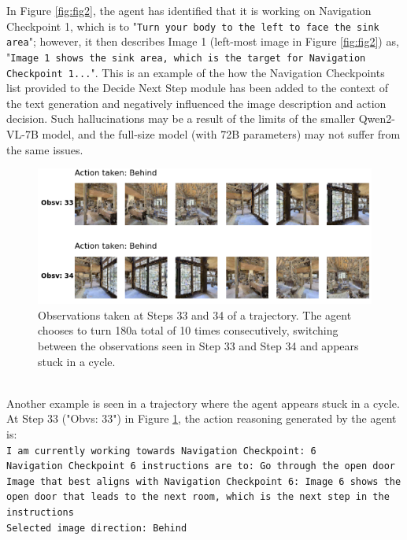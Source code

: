 \documentclass{svproc}
\begin{document}
    In Figure \ref{fig:fig2}, the agent has identified that it is working on Navigation Checkpoint 1, which is to "\texttt{Turn your body to the left to face the sink area}"; however, it then describes Image 1 (left-most image in Figure \ref{fig:fig2}) as, "\texttt{Image 1 shows the sink area, which is the target for Navigation Checkpoint 1...}". This is an example of the how the Navigation Checkpoints list provided to the Decide Next Step module has been added to the context of the text generation and negatively influenced the image description and action decision. Such hallucinations may be a result of the limits of the smaller Qwen2-VL-7B model, and the full-size model (with 72B parameters) may not suffer from the same issues.
    \\
    \begin{figure}
        \centering
        \includegraphics[scale=0.5]{figures/EU6Fwq7SyZv_16908_steps33-34.png}
        \caption{Observations taken at Steps 33 and 34 of a trajectory. The agent chooses to turn 180\textdegree a total of 10 times consecutively, switching between the observations seen in Step 33 and Step 34 and appears stuck in a cycle.}
        \label{fig:fig3}
    \end{figure}
    \\ Another example is seen in a trajectory where the agent appears stuck in a cycle. At Step 33 ("Obvs: 33") in Figure \ref{fig:fig3}, the action reasoning generated by the agent is: \\
        \texttt{I am currently working towards Navigation Checkpoint: 6 \\
        Navigation Checkpoint 6 instructions are to: Go through the open door \\
        Image that best aligns with Navigation Checkpoint 6: Image 6 shows the open door that leads to the next room, which is the next step in the instructions \\
        Selected image direction: Behind
        }
    \\ \\    
\end{document}
